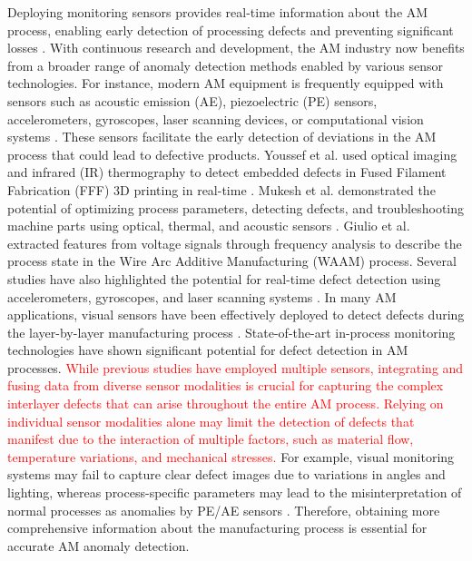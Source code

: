 \documentclass[preprint,12pt]{elsarticle}
\begin{document}
Deploying monitoring sensors provides real-time information about the AM process, enabling early detection of processing defects and preventing significant losses \cite{RN323}. With continuous research and development, the AM industry now benefits from a broader range of anomaly detection methods enabled by various sensor technologies. For instance, modern AM equipment is frequently equipped with sensors such as acoustic emission (AE), piezoelectric (PE) sensors, accelerometers, gyroscopes, laser scanning devices, or computational vision systems \cite{RN326}. These sensors facilitate the early detection of deviations in the AM process that could lead to defective products. Youssef et al. used optical imaging and infrared (IR) thermography to detect embedded defects in Fused Filament Fabrication (FFF) 3D printing in real-time \cite{RN327}. Mukesh et al. demonstrated the potential of optimizing process parameters, detecting defects, and troubleshooting machine parts using optical, thermal, and acoustic sensors \cite{RN328}. Giulio et al. extracted features from voltage signals through frequency analysis to describe the process state in the Wire Arc Additive Manufacturing (WAAM) process. Several studies have also highlighted the potential for real-time defect detection using accelerometers, gyroscopes, and laser scanning systems \cite{RN329, RN330}. In many AM applications, visual sensors have been effectively deployed to detect defects during the layer-by-layer manufacturing process \cite{RN333}. State-of-the-art in-process monitoring technologies have shown significant potential for defect detection in AM processes. \textcolor{red}{While previous studies have employed multiple sensors, integrating and fusing data from diverse sensor modalities is crucial for capturing the complex interlayer defects that can arise throughout the entire AM process. Relying on individual sensor modalities alone may limit the detection of defects that manifest due to the interaction of multiple factors, such as material flow, temperature variations, and mechanical stresses.} For example, visual monitoring systems may fail to capture clear defect images due to variations in angles and lighting, whereas process-specific parameters may lead to the misinterpretation of normal processes as anomalies by PE/AE sensors \cite{RN325}. Therefore, obtaining more comprehensive information about the manufacturing process is essential for accurate AM anomaly detection.
\end{document}
